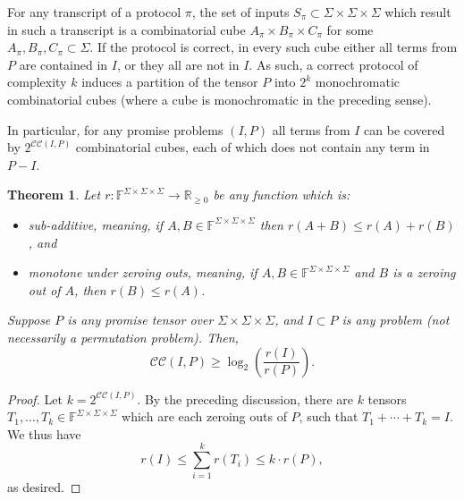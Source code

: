 \documentclass[10pt,a4paper]{article}
\newtheorem{theorem}{Theorem}
\newcommand{\F}{\mathbb{F}}
\newcommand{\cc}{\mathcal{CC}}
\newcommand{\jnote}[1]{\todo[inline, color=blue!30!white]{#1 \\ -\textsc{Jarek}}}
\newcommand{\joshnote}[1]{\todo[inline, color=red!30!white]{#1 \\ -\textsc{Josh}}}
\begin{document}
For any transcript of a protocol $\pi$, the set of inputs $S_{\pi} \subset \Sigma \times \Sigma \times \Sigma$ which result in such a transcript is a combinatorial cube $A_\pi \times B_\pi \times C_\pi$ for some $A_\pi, B_\pi, C_\pi \subset \Sigma$. If the protocol is correct, in every such cube either all terms from $P$ are contained in $I$, or they all are not in $I$. As such, a correct protocol of complexity $k$ induces a partition of the tensor $P$ into $2^k$ monochromatic combinatorial cubes (where a cube is monochromatic in the preceding sense). 

In particular, for any promise problems $(I, P)$ all terms from $I$ can be covered by $2^{\cc(I, P)}$ combinatorial cubes, each of which does not contain any term in $P - I$.

\begin{theorem} \label{thm:subadditive}
Let $r : \F^{\Sigma \times \Sigma \times \Sigma} \to \mathbb{R}_{\geq 0}$ be any function which is:
\begin{itemize}
    \item \emph{sub-additive}, meaning, if $A,B \in \F^{\Sigma \times \Sigma \times \Sigma}$ then $r(A+B) \leq r(A) + r(B)$, and
    \item \emph{monotone under zeroing outs}, meaning, if  $A,B \in \F^{\Sigma \times \Sigma \times \Sigma}$ and $B$ is a zeroing out of $A$, then $r(B) \leq r(A)$.
\end{itemize}
Suppose $P$ is any promise tensor over $\Sigma \times \Sigma \times \Sigma$, and $I \subset P$ is any problem (not necessarily a permutation problem). Then, $$\cc(I,P) \geq \log_2\left( \frac{r(I)}{r(P)} \right).$$
\end{theorem}


\begin{proof}
   Let $k = 2^{\cc(I,P)}$. By the preceding discussion, there are $k$ tensors $T_1, \ldots, T_k \in \F^{\Sigma \times \Sigma \times \Sigma}$ which are each zeroing outs of $P$, such that $T_1 + \cdots + T_k = I$. We thus have $$r(I) \leq \sum_{i=1}^k r(T_i) \leq k \cdot r(P),$$
    as desired.
\end{proof}
\end{document}
